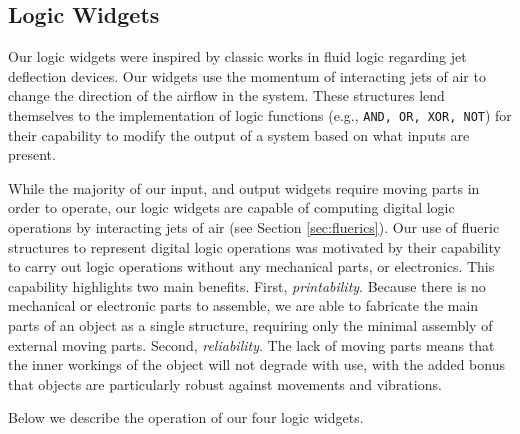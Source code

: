       \subsection{Logic Widgets}
        Our logic widgets were inspired by classic works in fluid logic
        regarding jet deflection devices. Our widgets use the momentum of
        interacting jets of air to change the direction of the airflow in
        the system. These structures lend themselves to the implementation
        of logic functions (e.g., \texttt{AND, OR, XOR, NOT}) for their
        capability to modify the output of a system based on what inputs
        are present.

        While the majority of our input, and output widgets require
        moving parts in order to operate, our logic widgets are capable of
        computing digital logic operations by interacting jets of air (see
        Section \ref{sec:fluerics}). Our use of flueric structures to represent
        digital logic operations was motivated by their capability to carry
        out logic operations without any mechanical parts, or electronics.
        This capability highlights two main benefits. First,
        \emph{printability}. Because there is no mechanical or electronic
        parts to assemble, we are able to fabricate the main parts of an \al
        object as a single structure, requiring only the minimal assembly of
        external moving parts. Second, \emph{reliability}. The lack of moving
        parts means that the inner workings of the object will not degrade
        with use, with the added bonus that \al objects are particularly
        robust against movements and vibrations.

        Below we describe the operation of our four logic widgets.

